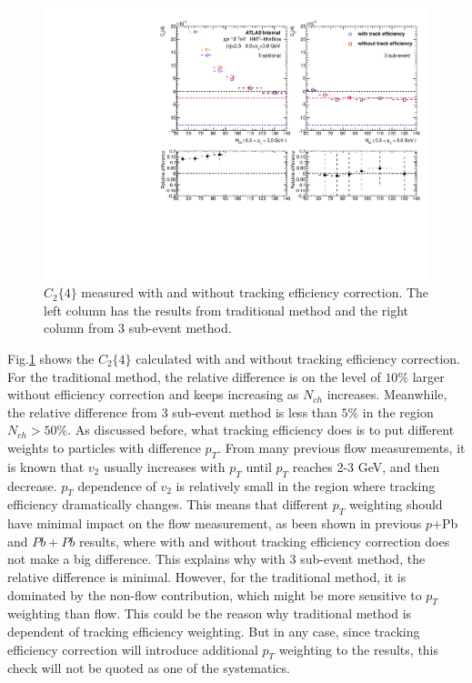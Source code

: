 \begin{figure}[H]
\centering
\includegraphics[width=0.8\linewidth]{figs/sec_sys/pp13/sys_pp13_trkEff.pdf}
\caption{$C_{2}\{4\}$ measured with and without tracking efficiency correction. The left column has the results from traditional method and the right column from 3 sub-event method.}
\label{fig:sys_pp13_trkEff}
\end{figure}
Fig.\ref{fig:sys_pp13_trkEff} shows the $C_{2}\{4\}$ calculated with and without tracking efficiency correction. For the traditional method, the relative difference is on the level of $10\%$ larger without efficiency correction and keeps increasing as $N_{ch}$ increases. Meanwhile, the relative difference from 3 sub-event method is less than $5\%$ in the region $N_{ch}>50\%$. As discussed before, what tracking efficiency does is to put different weights to particles with difference $p_{T}$. From many previous flow measurements, it is known that $v_{2}$ usually increases with $p_{T}$ until $p_{T}$ reaches 2-3 GeV, and then decrease. $p_{T}$ dependence of $v_{2}$ is relatively small in the region where tracking efficiency dramatically changes. This means that different $p_{T}$ weighting should have minimal impact on the flow measurement, as been shown in previous $p$+Pb and $Pb+Pb$ results, where with and without tracking efficiency correction does not make a big difference. This explains why with 3 sub-event method, the relative difference is minimal. However, for the traditional method, it is dominated by the non-flow contribution, which might be more sensitive to $p_{T}$ weighting than flow. This could be the reason why traditional method is dependent of tracking efficiency weighting. But in any case, since tracking efficiency correction will introduce additional $p_{T}$ weighting to the results, this check will not be quoted as one of the systematics.

